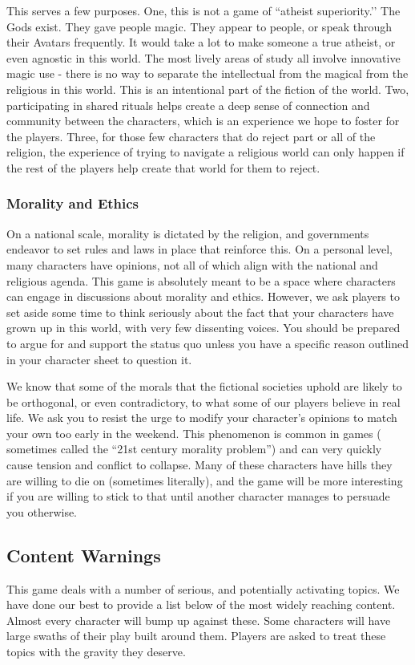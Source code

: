 \documentclass[sheet]{GL2020}
\begin{document}
This serves a few purposes. One, this is not a game of ``atheist superiority.’’ The Gods exist. They gave people magic. They appear to people, or speak through their Avatars frequently. It would take a lot to make someone a true atheist, or even agnostic in this world. The most lively areas of study all involve innovative magic use - there is no way to separate the intellectual from the magical from the religious in this world. This is an intentional part of the fiction of the world. Two, participating in shared rituals helps create a deep sense of connection and community between the characters, which is an experience we hope to foster for the players. Three, for those few characters that do reject part or all of the religion, the experience of trying to navigate a religious world can only happen if the rest of the players help create that world for them to reject.

\subsubsection{Morality and Ethics}
On a national scale, morality is dictated by the religion, and governments endeavor to set rules and laws in place that reinforce this. On a personal level, many characters have opinions, not all of which align with the national and religious agenda. This game is absolutely meant to be a space where characters can engage in discussions about morality and ethics. However, we ask players to set aside some time to think seriously about the fact that your characters have grown up in this world, with very few dissenting voices. You should be prepared to argue for and support the status quo unless you have a specific reason outlined in your character sheet to question it.

We know that some of the morals that the fictional societies uphold are likely to be orthogonal, or even contradictory, to what some of our players believe in real life. We ask you to resist the urge to modify your character’s opinions to match your own too early in the weekend. This phenomenon is common in games ( sometimes called the “21st century morality problem”) and can very quickly cause tension and conflict to collapse. Many of these characters have hills they are willing to die on (sometimes literally), and the game will be more interesting if you are willing to stick to that until another character manages to persuade you otherwise. 

\subsection{Content Warnings}
This game deals with a number of serious, and potentially activating topics. We have done our best to provide a list below of the most widely reaching content. Almost every character will bump up against these. Some characters will have large swaths of their play built around them. Players are asked to treat these topics with the gravity they deserve.
\end{document}
